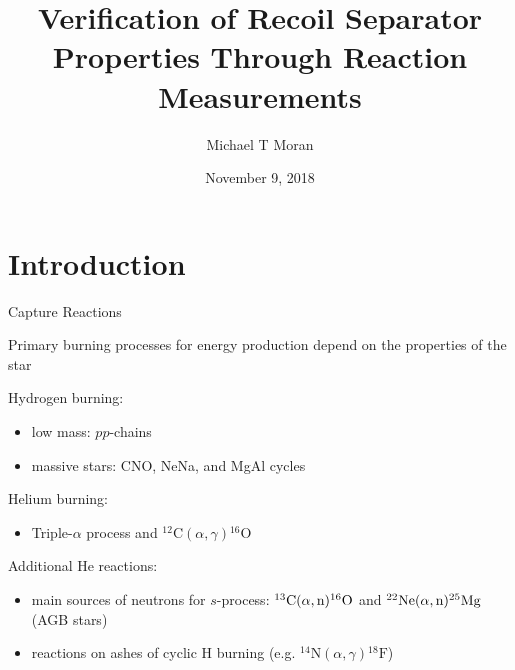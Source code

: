 \documentclass[10pt]{beamer}
\title{
    Verification of Recoil Separator Properties Through Reaction Measurements
}
\subtitle{}
\date{November 9, 2018}
\author{Michael T Moran}
\institute{University of Notre Dame}
\newcommand{\mnuc}[2]{{}^{#1}\textrm{#2}}
\newcommand{\react}[4]{$#1(#2,#3)#4$}
\begin{document}
\maketitle


\section{Introduction}

\begin{frame}[fragile]{Capture Reactions}

    Primary burning processes for energy production depend on the
    properties of the star

    Hydrogen burning:
    \begin{itemize}
        \item low mass: $pp$-chains
        \item massive stars: CNO, NeNa, and MgAl cycles
    \end{itemize}

    Helium burning:
    \begin{itemize}
        \item Triple-$\alpha$ process and \react{\mnuc{12}{C}}{\alpha}{\gamma}{\mnuc{16}{O}}
    \end{itemize}

    Additional He reactions:
    \begin{itemize}
        \item main sources of neutrons for $s$-process:
            \react{\mnuc{13}{C}}{\alpha}{\rm n}{\mnuc{16}{O}} and
            \react{\mnuc{22}{Ne}}{\alpha}{\rm n}{\mnuc{25}{Mg}} (AGB
            stars)
        \item reactions on ashes of cyclic H burning (e.g.
            \react{\mnuc{14}{N}}{\alpha}{\gamma}{\mnuc{18}{F}})
    \end{itemize}

\end{frame}
\end{document}
